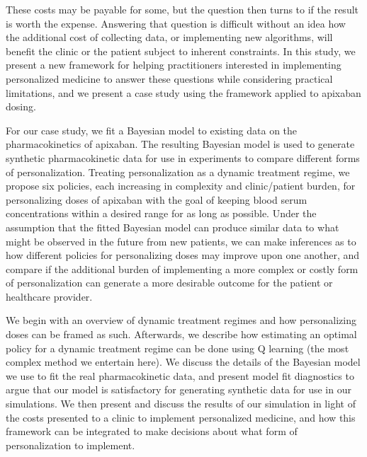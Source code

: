 These costs may be payable for some, but the question then turns to if the result is worth the expense.  Answering that question is difficult without an idea how the additional cost of collecting data, or implementing new algorithms, will benefit the clinic or the patient subject to inherent constraints.  In this study, we present a new framework for helping practitioners interested in implementing personalized medicine to answer these questions while considering practical limitations, and we present a case study using the framework applied to apixaban dosing.

For our case study, we fit a Bayesian model to existing data on the pharmacokinetics of apixaban.  The resulting Bayesian model is used to generate synthetic pharmacokinetic data for use in experiments to compare different forms of personalization. Treating personalization as a dynamic treatment regime, we propose six policies, each increasing in complexity and clinic/patient burden, for personalizing doses of apixaban with the goal of keeping blood serum concentrations within a desired range for as long as possible. Under the assumption that the fitted Bayesian model can produce similar data to what might be observed in the future from new patients, we can make inferences as to how different policies for personalizing doses may improve upon one another, and compare if the additional burden of implementing a more complex or costly form of personalization can generate a more desirable outcome for the patient or healthcare provider.  

We begin with an overview of dynamic treatment regimes and how personalizing doses can be framed as such.  Afterwards, we describe how estimating an optimal policy for a dynamic treatment regime can be done using Q learning (the most complex method we entertain here).  We discuss the details of the Bayesian model we use to fit the real pharmacokinetic data, and present model fit diagnostics to argue that our model is satisfactory for generating synthetic data for use in our simulations. We then present and discuss the results of our simulation in light of the costs presented to a clinic to implement personalized medicine, and how this framework can be integrated to make decisions about what form of personalization to implement.


